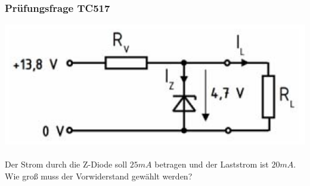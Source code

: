 \begin{frame}
    \frametitle{Prüfungsfrage TC517}
    \begin{center}
            \includegraphics[width=1\textwidth]{a05/TC517.png}\\
            \tiny \hyperlink{refs}{\cite{bna}} \\[1em] \large
	Der Strom durch die Z-Diode soll $25 mA$ betragen und der Laststrom ist $20 mA$.\\ Wie groß muss der Vorwiderstand gewählt werden?
        \end{center}
\end{frame}

